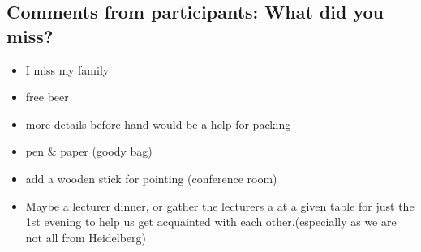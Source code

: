 \documentclass[11pt,a4paper]{article}
\numberwithin{equation}{section}
\numberwithin{table}{section}\setlength{\multlinegap}{25pt}
\begin{document}
\newpage

\subsection{Comments from participants: What did you miss?}
\begin{itemize}
\item I miss my family
\item free beer
\item more details before hand would be a help for packing
\item pen \& paper (goody bag)
\item add a wooden stick for pointing (conference room)
\item Maybe a lecturer dinner, or gather the lecturers a at a given table for just the 1st evening to help us get acquainted with each other.(especially as we are not all from Heidelberg)
\end{itemize}
\end{document}
